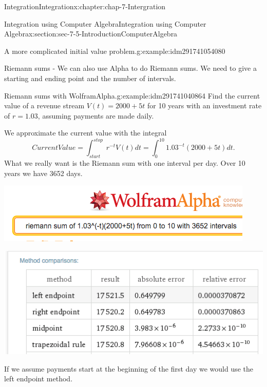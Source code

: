 \documentclass[oneside,10pt,]{book}
\numberwithin{equation}{section}
\begin{document}
\begin{chapterptx}{Integration}{}{Integration}{}{}{x:chapter:chap-7-Intergration}
\begin{sectionptx}{Integration using Computer Algebra}{}{Integration using Computer Algebra}{}{}{x:section:sec-7-5-IntroductionComputerAlgebra}
\begin{example}{A more complicated initial value problem.}{g:example:idm291741054080}
\begin{sidebyside}{1}{0.05}{0.05}{0}
\begin{sbspanel}{0.9}
\end{sbspanel}%
\end{sidebyside}%
\end{example}
Riemann sums - We can also use Alpha to do Riemann sums.  We need to give a starting and ending point and the number of intervals.%
\begin{example}{Riemann sums with Wolfram\textbar{}Alpha.}{g:example:idm291741040864}%
Find the current value of a revenue stream \(V(t)=2000+5t\) for 10 years with an investment rate of \(r=1.03\), assuming payments are made daily.%
\par
We approximate the current value with the integral%
%
\begin{equation*}
CurrentValue=\int_{start}^{stop} r^{-t} V(t)dt= \int_0^{10} 1.03^{-t} (2000+5t)dt.
\end{equation*}
What we really want is the Riemann sum with one interval per day.  Over 10 years we have 3652 days.%
\begin{sidebyside}{1}{0.15}{0.15}{0}%
\begin{sbspanel}{0.7}%
\includegraphics[width=\linewidth]{images/sec7-5-23.png}
\end{sbspanel}%
\end{sidebyside}%
\begin{sidebyside}{1}{0.15}{0.15}{0}%
\begin{sbspanel}{0.7}%
\includegraphics[width=\linewidth]{images/sec7-5-24.png}
\end{sbspanel}%
\end{sidebyside}%
\par
If we assume payments start at the beginning of the first day we would use the left endpoint method.%

\end{example}
\end{sectionptx}
\end{chapterptx}
\end{document}
